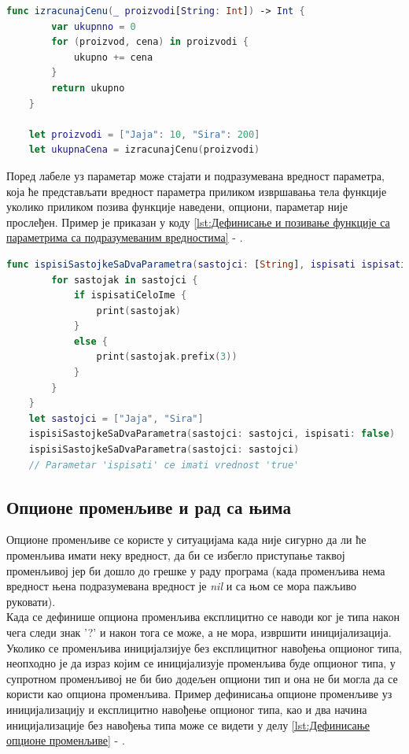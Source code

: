 \documentclass[12pt,oneside]{memoir}
\begin{document}
\begin{lstlisting}[caption=\textit{{Дефинисање и позивање функције са повратном вредношћу}}, label={lst:Дефинисање и позивање функције са повратном вредношћу}, language=Swift, frame=single]
    func izracunajCenu(_ proizvodi[String: Int]) -> Int {
        var ukupnno = 0
        for (proizvod, cena) in proizvodi {
            ukupno += cena
        }
        return ukupno
    }
    
    let proizvodi = ["Jaja": 10, "Sira": 200]
    let ukupnaCena = izracunajCenu(proizvodi)
\end{lstlisting}
    
\indent Поред лабеле уз параметар може стајати и подразумевана вредност параметра, која ће представљати вредност параметра приликом извршавања тела функције уколико приликом позива функције наведени, опциони, параметар није прослеђен. Пример је приказан у коду \ref{lst:Дефинисање и позивање функције са параметрима са подразумеваним вредностима} - .
    
\begin{lstlisting}[caption=\textit{{Дефинисање и позивање функције са параметрима са подразумеваним вредностима}}, label={lst:Дефинисање и позивање функције са параметрима са подразумеваним вредностима}, language=Swift, frame=single]
    func ispisiSastojkeSaDvaParametra(sastojci: [String], ispisati ispisatiCeloIme: Bool = true) {
        for sastojak in sastojci {
            if ispisatiCeloIme {
                print(sastojak)
            }
            else {
                print(sastojak.prefix(3))
            }
        }
    }
    let sastojci = ["Jaja", "Sira"]
    ispisiSastojkeSaDvaParametra(sastojci: sastojci, ispisati: false)
    ispisiSastojkeSaDvaParametra(sastojci: sastojci)
    // Parametar 'ispisati' ce imati vrednost 'true'
\end{lstlisting}

\subsection{Опционе променљиве и рад са њима}

\indent Опционе променљиве се користе у ситуацијама када није сигурно да ли ће променљива имати неку вредност, да би се избегло приступање таквој променљивој јер би дошло до грешке у раду програма (када променљива нема вредност њена подразумевана вредност је \textit{nil} и са њом се мора пажљиво руковати).
\\
\indent Када се дефинише опциона променљива експлицитно се наводи ког је типа након чега следи знак '?' и након тога се може, а не мора, извршити иницијализација. Уколико се променљива иницијалзијуе без експлицитног навођења опционог типа, неопходно је да израз којим се иницијализује променљива буде опционог типа, у супротном променљивој не би био додељен опциони тип и она не би могла да се користи као опциона променљива. Пример дефинисања опционе променљиве уз иницијализацију и експлицитно навођење опционог типа, као и два начина иницијализације без навођења типа може се видети у делу \ref{lst:Дефинисање опционе променљиве} - .
\end{document}
